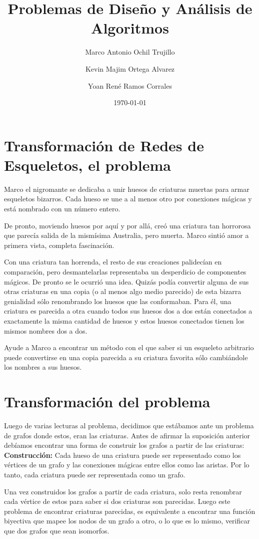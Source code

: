 \documentclass{article}
\title {Problemas de Diseño y Análisis de Algoritmos }
\author{Marco Antonio Ochil Trujillo \and Kevin Majim Ortega Alvarez \and Yoan René Ramos Corrales}
\date{\today}
\begin{document}
\maketitle
\newpage
\tableofcontents
\newpage

\section{Transformación de Redes de Esqueletos, el problema}

Marco el nigromante se dedicaba a unir huesos de criaturas muertas para armar esqueletos bizarros. Cada hueso se une a al menos otro por conexiones mágicas y está nombrado con un número entero.

De pronto, moviendo huesos por aquí y por allá, creó una criatura tan horrorosa que parecía salida de la mismísima Australia, pero muerta. Marco sintió amor a primera vista, completa fascinación.

Con una criatura tan horrenda, el resto de sus creaciones palidecían en comparación, pero desmantelarlas representaba un desperdicio de componentes mágicos. De pronto se le ocurrió una idea. Quizás podía convertir alguna de sus otras criaturas en una copia (o al menos algo medio parecido) de esta bizarra genialidad sólo renombrando los huesos que las conformaban. Para él, una criatura es parecida a otra cuando todos sus huesos dos a dos están conectados a exactamente la misma cantidad de huesos y estos huesos conectados tienen los mismos nombres dos a dos.

Ayude a Marco a encontrar un método con el que saber si un esqueleto arbitrario puede convertirse en una copia parecida a su criatura favorita sólo cambiándole los nombres a sus huesos.

\section{Transformación del problema}
Luego de varias lecturas al problema, decidimos que estábamos ante un problema de grafos donde estos, eran las criaturas. Antes de afirmar la suposición anterior debíamos encontrar una forma de construir los grafos a partir de las criaturas: \\
\textbf{Construcción:} Cada hueso de una criatura puede ser representado como los vértices de un grafo y las conexiones mágicas entre ellos como las aristas.
Por lo tanto, cada criatura puede ser representada como un grafo.

Una vez construidos los grafos a partir de cada criatura, solo resta renombrar cada vértice de estos para saber si dos criaturas son parecidas. Luego este problema de encontrar criaturas parecidas, es equivalente a encontrar una función biyectiva que mapee los nodos de un grafo a otro, o lo que es lo mismo, verificar que dos grafos que sean isomorfos.\\
\end{document}
